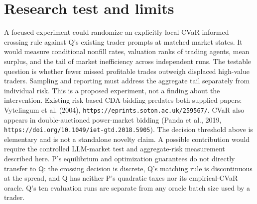\documentclass{article}
\begin{document}
\section*{Research test and limits}
A focused experiment could randomize an explicitly local CVaR-informed
crossing rule against Q's existing trader prompts at matched market states.
It would measure conditional nonfill rates, valuation ranks of trading agents,
mean surplus, and the tail of market inefficiency across independent runs. The
testable question is whether fewer missed profitable trades outweigh displaced
high-value traders. Sampling and reporting must address the aggregate tail
separately from individual risk. This is a proposed experiment, not a finding
about the intervention. Existing risk-based CDA bidding predates both supplied
papers: Vytelingum et al. (2004),
\texttt{https://eprints.soton.ac.uk/259567/}. CVaR also appears in
double-auctioned power-market bidding (Panda et al., 2019,
\texttt{https://doi.org/10.1049/iet-gtd.2018.5905}). The decision threshold
above is elementary and is not a standalone novelty claim. A possible
contribution would require the controlled LLM-market test and aggregate-risk
measurement described here.
P's equilibrium and optimization guarantees do not directly transfer to Q:
the crossing decision is discrete, Q's matching rule is discontinuous at the
spread, and Q has neither P's quadratic taxes nor its empirical-CVaR oracle.
Q's ten evaluation runs are separate from any oracle batch size used by a
trader.
\end{document}
